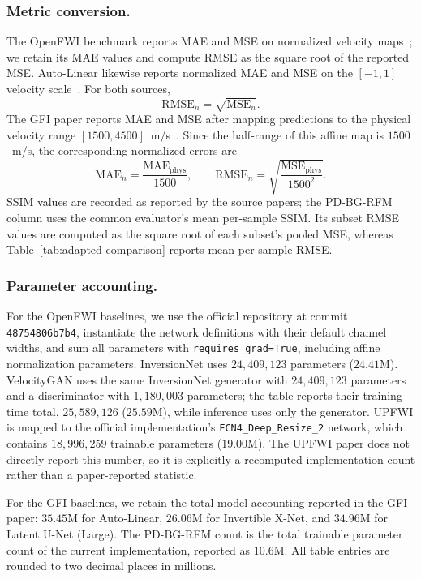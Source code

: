 \subsubsection{Metric conversion.}
The OpenFWI benchmark reports MAE and MSE on normalized velocity maps~\cite{deng2022openfwi}; we retain its MAE values and compute RMSE as the square root of the reported MSE. Auto-Linear likewise reports normalized MAE and MSE on the $[-1,1]$ velocity scale~\cite{feng2024autolinear}. For both sources,
\begin{equation}
\mathrm{RMSE}_{n}=\sqrt{\mathrm{MSE}_{n}}.
\end{equation}
The GFI paper reports MAE and MSE after mapping predictions to the physical velocity range $[1500,4500]$~m/s~\cite{gupta2025gfi}. Since the half-range of this affine map is $1500$~m/s, the corresponding normalized errors are
\begin{equation}
\mathrm{MAE}_{n}=\frac{\mathrm{MAE}_{\mathrm{phys}}}{1500},
\qquad
\mathrm{RMSE}_{n}=\sqrt{\frac{\mathrm{MSE}_{\mathrm{phys}}}{1500^2}}.
\end{equation}
SSIM values are recorded as reported by the source papers; the PD-BG-RFM column uses the common evaluator's mean per-sample SSIM. Its subset RMSE values are computed as the square root of each subset's pooled MSE, whereas Table~\ref{tab:adapted-comparison} reports mean per-sample RMSE.

\subsubsection{Parameter accounting.}
For the OpenFWI baselines, we use the official repository at commit \texttt{48754806b7b4}, instantiate the network definitions with their default channel widths, and sum all parameters with \texttt{requires\_grad=True}, including affine normalization parameters. InversionNet uses $24{,}409{,}123$ parameters ($24.41$M). VelocityGAN uses the same InversionNet generator with $24{,}409{,}123$ parameters and a discriminator with $1{,}180{,}003$ parameters; the table reports their training-time total, $25{,}589{,}126$ ($25.59$M), while inference uses only the generator. UPFWI is mapped to the official implementation's \texttt{FCN4\_Deep\_Resize\_2} network, which contains $18{,}996{,}259$ trainable parameters ($19.00$M). The UPFWI paper does not directly report this number, so it is explicitly a recomputed implementation count rather than a paper-reported statistic.

For the GFI baselines, we retain the total-model accounting reported in the GFI paper: $35.45$M for Auto-Linear, $26.06$M for Invertible X-Net, and $34.96$M for Latent U-Net (Large). The PD-BG-RFM count is the total trainable parameter count of the current implementation, reported as $10.6$M. All table entries are rounded to two decimal places in millions.

